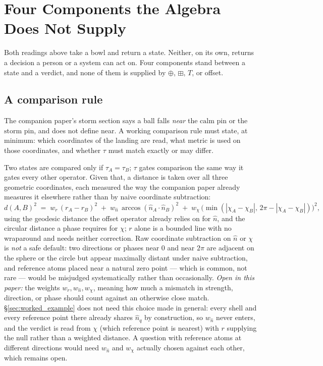 \documentclass[12pt, a4paper]{article}
\begin{document}
\section{Four Components the Algebra Does Not Supply}
\label{sec:four_gaps}

Both readings above take a bowl and return a state. Neither, on its
own, returns a decision a person or a system can act on. Four
components stand between a state and a verdict, and none of them is
supplied by $\oplus$, $\boxplus$, $T$, or offset.

\subsection{A comparison rule}
\label{subsec:comparison_rule}
The companion paper's storm section says a ball falls \emph{near} the
$\mathrm{calm}$ pin or the $\mathrm{storm}$ pin, and does not define
near. A working comparison rule must state, at minimum: which
coordinates of the landing are read, what metric is used on those
coordinates, and whether $\tau$ must match exactly or may differ.

Two states are compared only if $\tau_A=\tau_B$; $\tau$ gates
comparison the same way it gates every other operator. Given that, a
distance is taken over all three geometric coordinates, each measured
the way the companion paper already measures it elsewhere rather than
by naive coordinate subtraction:
\begin{equation}
    d(A,B)^2 \;=\;
    w_r\,(r_A-r_B)^2
    \;+\;
    w_{\hat n}\,\arccos(\hat n_A\cdot\hat n_B)^2
    \;+\;
    w_\chi\,\bigl(\min(|\chi_A-\chi_B|,\,2\pi-|\chi_A-\chi_B|)\bigr)^2 ,
    \label{eq:comparison_metric}
\end{equation}
using the geodesic distance the offset operator already relies on for
$\hat n$, and the circular distance a phase requires for $\chi$; $r$
alone is a bounded line with no wraparound and needs neither
correction. Raw coordinate subtraction on $\hat n$ or $\chi$ is
\emph{not} a safe default: two directions or phases near $0$ and near
$2\pi$ are adjacent on the sphere or the circle but appear maximally
distant under naive subtraction, and reference atoms placed near a
natural zero point --- which is common, not rare --- would be
misjudged systematically rather than occasionally. \emph{Open in this
paper:} the weights $w_r,w_{\hat n},w_\chi$, meaning how much a
mismatch in strength, direction, or phase should count against an
otherwise close match. \S\ref{sec:worked_example} does not need this
choice made in general: every shell and every reference point there
already shares $\hat n_q$ by construction, so $w_{\hat n}$ never
enters, and the verdict is read from $\chi$ (which reference point is
nearest) with $r$ supplying the null rather than a weighted distance.
A question with reference atoms at different directions would need
$w_{\hat n}$ and $w_\chi$ actually chosen against each other, which
remains open.
\end{document}

